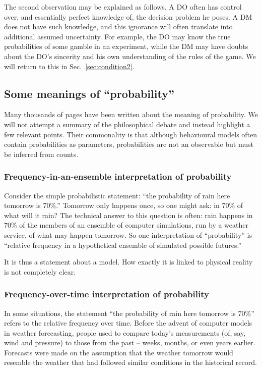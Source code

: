 \documentclass[a4paper, 12pt]{article}
\newcommand{\seclabel}[1]{\label{sec:#1}}
\newcommand{\secref}[1]{Sec.~\ref{sec:#1}}
\begin{document}
The second observation may be explained as follows. A DO often has control over, and essentially perfect knowledge of, the decision problem he poses. A DM does not have such knowledge, and this ignorance will often translate into additional assumed uncertainty. For example, the DO may know the true probabilities of some gamble in an experiment, while the DM may have doubts about the DO's sincerity and his own understanding of the rules of the game. We will return to this in \secref{condition2}.

\subsection{Some meanings of ``probability'' \seclabel{tricky}}
Many thousands of pages have been written about the meaning of probability. We will not attempt a summary of the philosophical debate and instead highlight a few relevant points. Their commonality is that although behavioural models often contain probabilities as parameters, probabilities are not an observable but must be inferred from counts.

\subsubsection*{Frequency-in-an-ensemble interpretation of probability}
Consider the simple probabilistic statement: ``the probability of rain here tomorrow is 70\%.'' Tomorrow only happens once, so one might ask: in 70\% of what will it rain? The technical answer to this question is often: rain happens in 70\% of the members of an ensemble of computer simulations, run by a weather service, of what may happen tomorrow. So one interpretation of ``probability'' is ``relative frequency in a hypothetical ensemble of simulated possible futures.''

It is thus a statement about a model. How exactly it is linked to physical reality is not completely clear.

\subsubsection*{Frequency-over-time interpretation of probability}
In some situations, the statement ``the probability of rain here tomorrow is 70\%'' refers to the relative frequency over time. Before the advent of computer models in weather forecasting, people used to compare today's measurements (of, say, wind and pressure) to those from the past -- weeks, months, or even years earlier. Forecasts were made on the assumption that the weather tomorrow would resemble the weather that had followed similar conditions in the historical record.
\end{document}
